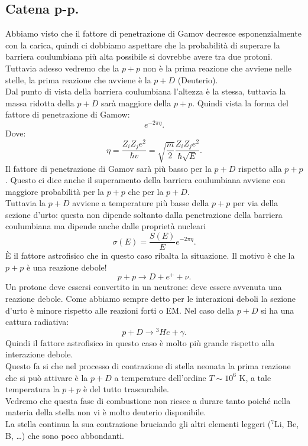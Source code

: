\subsection{Catena p-p.}%
\label{sub:Catena p-p.}
Abbiamo visto che il fattore di penetrazione di Gamov decresce esponenzialmente con la carica, quindi ci dobbiamo aspettare che la probabilità di superare la barriera coulumbiana più alta possibile si dovrebbe avere tra due protoni. 
Tuttavia adesso vedremo che la $p+p$ non è la prima reazione che avviene nelle stelle, la prima reazione che avviene è la $p+D$ (Deuterio).\\
Dal punto di vista della barriera coulumbiana l'altezza è la stessa, tuttavia la massa ridotta della $p+D$ sarà maggiore della $p+p$. 
Quindi vista la forma del fattore di penetrazione di Gamow:
\[
    e^{-2\pi\eta}
.\] 
Dove: 
\[
\eta  = \frac{Z_iZ_j e^2}{\hbar  v} 
= \sqrt{\frac{m}{2}}\frac{Z_iZ_je^2}{\hbar \sqrt{E}}
.\] 
Il fattore di penetrazione di Gamov sarà più basso per la $p+D$ rispetto alla $p+p$. Questo ci dice anche il superamento della barriera coulumbiana avviene con maggiore probabilità per la $p+p$  che per la $p+D$.\\
Tuttavia la $p+D$  avviene a temperature più basse della $p+p$ per via della sezione d'urto: questa non dipende soltanto dalla penetrazione della barriera coulumbiana ma dipende anche dalle proprietà nucleari
\[
    \sigma (E) = \frac{S(E) }{E}e^{-2\pi\eta}
.\] 
È il fattore astrofisico che in questo caso ribalta la situazione. Il motivo è che la $p+p$ è una reazione debole!
\[
p+p\to D +e^+ +\nu
.\] 
Un protone deve essersi convertito in un neutrone: deve essere avvenuta una reazione debole. 
Come abbiamo sempre detto per le interazioni deboli la sezione d'urto è minore rispetto alle reazioni forti o EM. Nel caso della $p+D$ si ha una cattura radiativa:
\[
    p+D \to {}^3He + \gamma
.\]  
Quindi il fattore astrofisico in questo caso è molto più grande rispetto alla interazione debole.\\
Questo fa si che nel processo di contrazione di stella neonata la prima reazione che si può attivare è la $p+D$ a temperature dell'ordine $T\sim 10^6$ K, a tale temperatura la $p+p$ è del tutto trascurabile.\\
Vedremo che questa fase di combustione non riesce a durare tanto poiché nella materia della stella non vi è molto deuterio disponibile.\\
La stella continua la sua contrazione bruciando gli altri elementi leggeri (${}^7$Li, Be, B, \ldots) che sono poco abbondanti. \\
